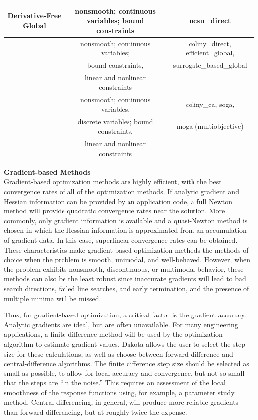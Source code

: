 \begin{table}[hbp]
\begin{tabular}{|c|c|c|}
\hline
Derivative-Free Global & nonsmooth; continuous variables; bound constraints
& ncsu\_direct \\
\hline
         & nonsmooth; continuous variables; & coliny\_direct, efficient\_global, \\
         & bound constraints, & surrogate\_based\_global \\
         & linear and nonlinear constraints & \\
\hline
         & nonsmooth; continuous variables, & coliny\_ea, soga, \\
         & discrete variables; bound constraints, & moga (multiobjective) \\
         & linear and nonlinear constraints & \\
\hline
\end{tabular}
\end{table}

{\bf Gradient-based Methods} \\
Gradient-based optimization methods are highly efficient, with the
best convergence rates of all of the optimization methods. If analytic
gradient and Hessian information can be provided by an application
code, a full Newton method will provide quadratic convergence rates
near the solution. More commonly, only gradient information is
available and a quasi-Newton method is chosen in which the Hessian
information is approximated from an accumulation of gradient data. In
this case, superlinear convergence rates can be obtained. These
characteristics make gradient-based optimization methods the methods
of choice when the problem is smooth, unimodal, and
well-behaved. However, when the problem exhibits nonsmooth,
discontinuous, or multimodal behavior, these methods can also be the
least robust since inaccurate gradients will lead to bad search
directions, failed line searches, and early termination, and the
presence of multiple minima will be missed.

Thus, for gradient-based optimization, a critical factor is the
gradient accuracy. Analytic gradients are ideal, but are often
unavailable. For many engineering applications, a finite difference
method will be used by the optimization algorithm to estimate gradient
values. Dakota allows the user to select the step size for these
calculations, as well as choose between forward-difference and
central-difference algorithms. The finite difference step size should
be selected as small as possible, to allow for local accuracy and
convergence, but not so small that the steps are ``in the noise.''
This requires an assessment of the local smoothness of the response
functions using, for example, a parameter study method. Central
differencing, in general, will produce more reliable gradients than
forward differencing, but at roughly twice the expense.

